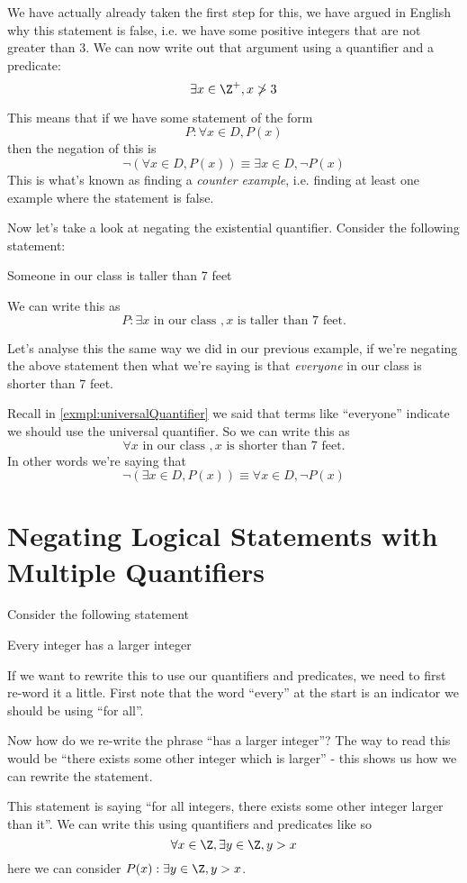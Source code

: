 We have actually already taken the first step for this, we have argued in English why this statement is false, i.e. we have some positive integers that are not greater than 3. We can now write out that argument using a quantifier and a predicate:
$$\exists x \in \Z^+, x \not > 3$$

This means that if we have some statement of the form
$$P: \forall x \in D, P(x)$$
then the negation of this is
$$\lnot \left(\forall x \in D, P(x)\right) \equiv \exists x \in D, \lnot P(x)$$
This is what's known as finding a \emph{counter example}, i.e. finding at least one example where the statement is false.

Now let's take a look at negating the existential quantifier. Consider the following statement:
\begin{center}
    Someone in our class is taller than 7 feet
\end{center}
We can write this as
$$P: \exists x \text{ in our class }, x \text{ is taller than 7 feet.}$$

Let's analyse this the same way we did in our previous example, if we're negating the above statement then what we're saying is that \emph{everyone} in our class is shorter than 7 feet.

Recall in \cref{exmpl:universalQuantifier} we said that terms like ``everyone'' indicate we should use the universal quantifier. So we can write this as
$$\forall x \text{ in our class }, x \text{ is shorter than 7 feet.}$$
In other words we're saying that
$$\lnot \left(\exists x \in D, P(x)\right) \equiv \forall x \in D, \lnot P(x)$$

\section{Negating Logical Statements with Multiple Quantifiers}
Consider the following statement
\begin{center}
    Every integer has a larger integer
\end{center}

If we want to rewrite this to use our quantifiers and predicates, we need to first re-word it a little. First note that the word ``every'' at the start is an indicator we should be using ``for all''.

Now how do we re-write the phrase ``has a larger integer''? The way to read this would be ``there exists some other integer which is larger'' - this shows us how we can rewrite the statement.

This statement is saying ``for all integers, there exists some other integer larger than it''. We can write this using quantifiers and predicates like so
$$\forall x \in \Z, \exists y \in \Z , y > x$$
here we can consider $P(x): \exists y \in \Z, y > x$.

